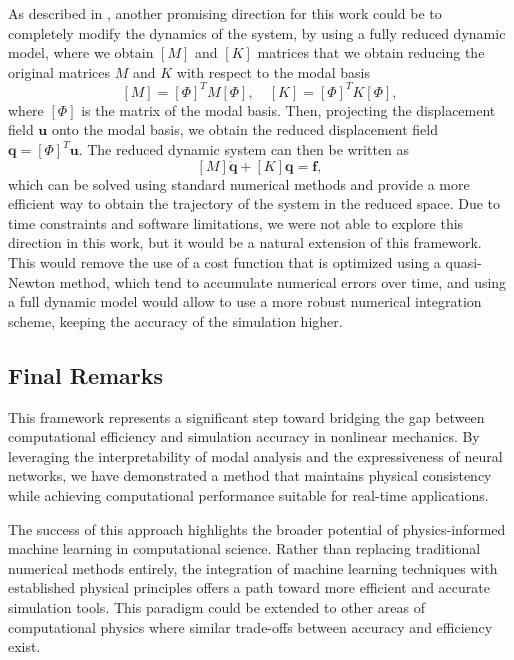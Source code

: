 \documentclass[11pt,a4paper]{article}
\numberwithin{equation}{section}
\begin{document}
As described in \cite{Andersson_2021}, another promising direction for this work could be to completely modify the dynamics of the system, by using a fully reduced dynamic model, where we obtain \(\left[M\right]\) and \(\left[K\right]\) matrices that we obtain reducing the original matrices \(M\) and \(K\) with respect to the modal basis
\begin{equation}
    \left[M\right] = \left[\Phi\right]^T M \left[\Phi\right], \quad \left[K\right] = \left[\Phi\right]^T K \left[\Phi\right],
\end{equation}
where \(\left[\Phi\right]\) is the matrix of the modal basis. Then, projecting the displacement field \(\mathbf{u}\) onto the modal basis, we obtain the reduced displacement field \(\mathbf{q} = \left[\Phi\right]^T \mathbf{u}\). The reduced dynamic system can then be written as
\begin{equation}
    \left[{M}\right] \ddot{\mathbf{q}} + \left[{K}\right] \mathbf{q} = \mathbf{f},
\end{equation}
which can be solved using standard numerical methods and provide a more efficient way to obtain the trajectory of the system in the reduced space. Due to time constraints and software limitations, we were not able to explore this direction in this work, but it would be a natural extension of this framework. This would remove the use of a cost function that is optimized using a quasi-Newton method, which tend to accumulate numerical errors over time, and using a full dynamic model would allow to use a more robust numerical integration scheme, keeping the accuracy of the simulation higher.


\subsection{Final Remarks}
This framework represents a significant step toward bridging the gap between computational efficiency and simulation accuracy in nonlinear mechanics. By leveraging the interpretability of modal analysis and the expressiveness of neural networks, we have demonstrated a method that maintains physical consistency while achieving computational performance suitable for real-time applications.

The success of this approach highlights the broader potential of physics-informed machine learning in computational science. Rather than replacing traditional numerical methods entirely, the integration of machine learning techniques with established physical principles offers a path toward more efficient and accurate simulation tools. This paradigm could be extended to other areas of computational physics where similar trade-offs between accuracy and efficiency exist.
\end{document}
